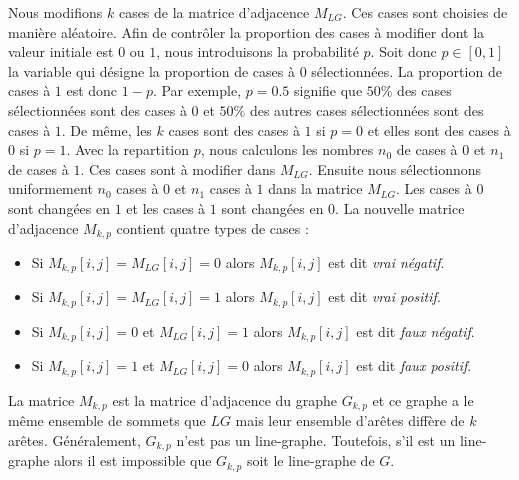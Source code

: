 Nous modifions $k$ cases de la matrice d'adjacence $M_{LG}$. Ces cases sont choisies de mani\`ere al\'eatoire. Afin de contr\^oler la proportion des cases \`a modifier dont la valeur initiale est $0$ ou $1$,  nous introduisons la probabilit\'e $p$.
\newline
Soit donc $p  \in [0,1]$ la variable qui d\'esigne la proportion de cases \`a $0$ s\'electionn\'ees. La proportion de cases \`a $1$ est donc $1-p$.
Par exemple, $p = 0.5$ signifie que $50\%$ des cases s\'electionn\'ees sont des cases \`a $0$ et $50\%$ des autres cases s\'electionn\'ees sont des cases \`a $1$. 
De m\^eme, les $k$ cases sont des cases \`a $1$ si $p = 0$ et elles sont des cases \`a $0$ si $p = 1$. 
 Avec la repartition $p$, nous calculons les nombres $n_0$ de cases \`a $0$ et $n_1$ de cases \`a $1$. Ces cases sont \`a modifier dans $M_{LG}$. 
Ensuite nous s\'electionnons uniformement $n_0$ cases \`a $0$ et $n_1$ cases \`a $1$ dans la matrice $M_{LG}$.
Les cases \`a $0$ sont chang\'ees en $1$ et les cases \`a $1$ sont chang\'ees en $0$.
La nouvelle matrice d'adjacence $M_{k,p}$ contient quatre types de cases :
\begin{itemize}
	\item Si $M_{k,p} [i,j] = M_{LG} [i,j] = 0$ alors $M_{k,p} [i,j]$ est dit {\em vrai n\'egatif}. 
	\item Si $M_{k,p} [i,j] = M_{LG} [i,j] = 1$ alors $M_{k,p} [i,j]$ est dit {\em vrai positif}. 
	\item Si $M_{k,p} [i,j] = 0$ et $M_{LG} [i,j] = 1$ alors $M_{k,p} [i,j]$ est dit {\em faux n\'egatif}.
	\item Si $M_{k,p} [i,j] = 1$ et $M_{LG} [i,j] = 0$ alors $M_{k,p} [i,j]$ est dit {\em faux positif}.
\end{itemize}
La matrice $M_{k,p}$ est la matrice d'adjacence du graphe $G_{k,p}$ et ce graphe a le m\^eme ensemble de sommets que $LG$ mais leur ensemble d'ar\^etes diff\`ere de $k$ ar\^etes.
G\'en\'eralement, $G_{k,p}$ n'est pas un line-graphe. Toutefois, s'il est un line-graphe alors il est  impossible que $G_{k,p}$ soit le line-graphe de $G$. 
